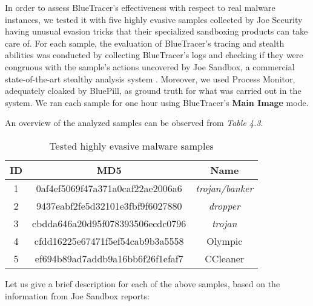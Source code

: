 In order to assess BlueTracer's effectiveness with respect to real malware instances, we tested it with five highly evasive samples collected by Joe Security \cite{JoeBox} having unusual evasion tricks that their specialized sandboxing products can take care of. For each sample, the evaluation of BlueTracer's tracing and stealth abilities was conducted by collecting BlueTracer's logs and checking if they were congruous with the sample's actions uncovered by Joe Sandbox, a commercial state-of-the-art stealthy analysis system \cite{JoeSandbox}. Moreover, we used Process Monitor, adequately cloaked by BluePill, as ground truth for what was carried out in the system.
We ran each sample for one hour using BlueTracer's \textbf{Main Image} mode.

An overview of the analyzed samples can be observed from \textit{Table 4.3}.


\begin{table}[h]
\vspace*{0.5cm}
\begin{center}
 \begin{tabular}{||c c c||} 
 \hline
 \textbf{ID} & \textbf{MD5} & \textbf{Name} \\ [0.5ex] 
 \hline\hline
 1 & 0af4ef5069f47a371a0caf22ae2006a6 & \textit{trojan/banker} \\ 
 \hline
 2 & 9437eabf2fe5d32101e3fbf9f6027880 & \textit{dropper} \\
 \hline
 3 & cbdda646a20d95f078393506ecdc0796 & \textit{trojan}\\
 \hline
 4 & cfdd16225e67471f5ef54cab9b3a5558 & Olympic\\
 \hline
 5 & ef694b89ad7addb9a16bb6f26f1efaf7 & CCleaner\\ [1ex] 
 \hline
\end{tabular}
\end{center}
\caption{Tested highly evasive malware samples}
\end{table}

Let us give a brief description for each of the above samples, based on the information from Joe Sandbox reports:

